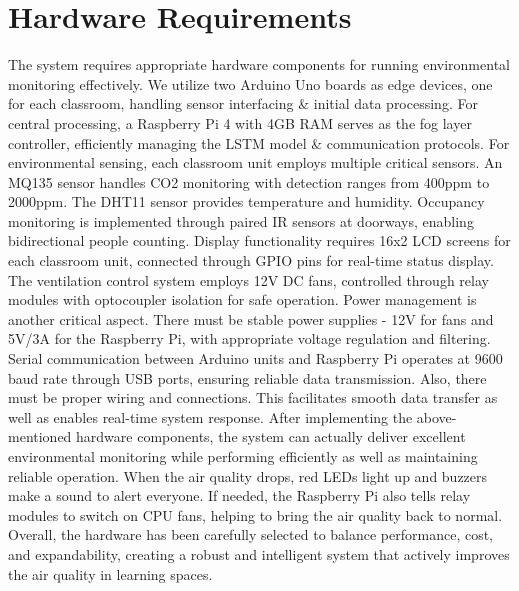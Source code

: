 \section{Hardware Requirements}
The system requires appropriate hardware components for running environmental monitoring effectively. We utilize two Arduino Uno boards as edge devices, one for each classroom, handling sensor interfacing \& initial data processing. For central processing, a Raspberry Pi 4 with 4GB RAM serves as the fog layer controller, efficiently managing the LSTM model \& communication protocols. For environmental sensing, each classroom unit employs multiple critical sensors. An MQ135 sensor handles CO2 monitoring with detection ranges from 400ppm to 2000ppm. The DHT11 sensor provides temperature and humidity. Occupancy monitoring is implemented through paired IR sensors at doorways, enabling bidirectional people counting. Display functionality requires 16x2 LCD screens for each classroom unit, connected through GPIO pins for real-time status display. The ventilation control system employs 12V DC fans, controlled through relay modules with optocoupler isolation for safe operation. Power management is another critical aspect. There must be stable power supplies - 12V for fans and 5V/3A for the Raspberry Pi, with appropriate voltage regulation and filtering. Serial communication between Arduino units and Raspberry Pi operates at 9600 baud rate through USB ports, ensuring reliable data transmission. Also, there must be proper wiring and connections. This facilitates smooth data transfer as well as enables real-time system response. After implementing the above-mentioned hardware components, the system can actually deliver excellent environmental monitoring while performing efficiently as well as maintaining reliable operation. When the air quality drops, red LEDs light up and buzzers make a sound to alert everyone. If needed, the Raspberry Pi also tells relay modules to switch on CPU fans, helping to bring the air quality back to normal. Overall, the hardware has been carefully selected to balance performance, cost, and expandability, creating a robust and intelligent system that actively improves the air quality in learning spaces.




